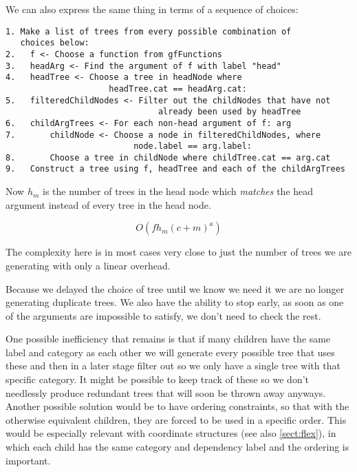 We can also express the same thing in terms of a sequence of choices:

\begin{verbatim}
1. Make a list of trees from every possible combination of
   choices below:
2.   f <- Choose a function from gfFunctions
3.   headArg <- Find the argument of f with label "head"
4.   headTree <- Choose a tree in headNode where 
                     headTree.cat == headArg.cat:
5.   filteredChildNodes <- Filter out the childNodes that have not 
                               already been used by headTree
6.   childArgTrees <- For each non-head argument of f: arg
7.       childNode <- Choose a node in filteredChildNodes, where 
                          node.label == arg.label:
8.       Choose a tree in childNode where childTree.cat == arg.cat
9.   Construct a tree using f, headTree and each of the childArgTrees
\end{verbatim}


Now $h_m$ is the number of trees in the head node which \emph{matches} the head argument instead of every tree in the head node.

$$
O(f h_m (c+m)^a)
$$

The complexity here is in most cases very close to just the number of trees we are generating with only a linear overhead. %

Because we delayed the choice of tree until we know we need it we are no longer generating duplicate trees.
We also have the ability to stop early, as soon as one of the arguments are impossible to satisfy, we don't need to check the rest.

One possible inefficiency that remains is that if many children have the same label and category as each other we will
generate every possible tree that uses these and then in a later stage filter out so we only have a single tree with that specific category. It might be possible to keep track of these so we don't needlessly produce redundant trees that will soon be thrown away anyways. 
Another possible solution would be to have ordering constraints, so that with the otherwise equivalent children, they are forced to be used in a specific order. This would be especially relevant with coordinate structures (see also \autoref{sect:flex}), in which each child has the same category and dependency label and the ordering is important.




